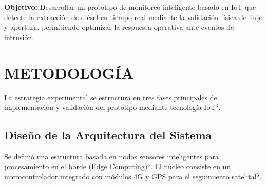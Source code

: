 \documentclass[twocolumn, 10pt]{article}
\begin{document}
\vspace{0.3cm}
\noindent\textbf{Objetivo:} Desarrollar un prototipo de monitoreo inteligente basado en IoT que detecte la extracción de diésel en tiempo real mediante la validación física de flujo y apertura, permitiendo optimizar la respuesta operativa ante eventos de intrusión.

\section*{METODOLOGÍA}

La estrategia experimental se estructura en tres fases principales de implementación y validación del prototipo mediante tecnología IoT$^{3}$.

\subsection*{Diseño de la Arquitectura del Sistema}

Se definió una estructura basada en nodos sensores inteligentes para procesamiento en el borde (Edge Computing)$^{5}$. El núcleo consiste en un microcontrolador integrado con módulos 4G y GPS para el seguimiento satelital$^{6}$.
\end{document}

